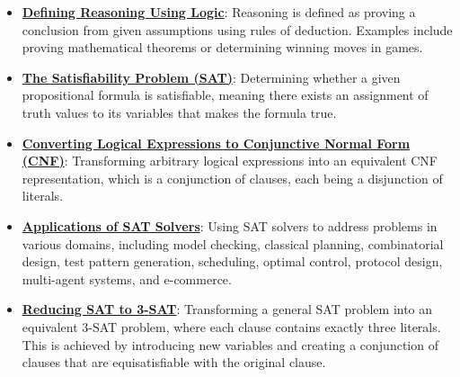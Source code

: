 \documentclass{article}%
\begin{document}
\begin{itemize}[leftmargin=*]%
\item \href{https://purdue.brightspace.com/d2l/common/assets/pdfjs-d2l-dist/1.0.14-legacy/web/viewer.html?file=\%2Fcontent\%2Fenforced\%2F1095467-wl.202510.CS.24300.001\%2F13L1-Logic.pdf\%3Fou\%3D1095467\&lang=en-us\&container=d2l-fileviewer-rendered-pdf\&fullscreen=d2l-fileviewer-rendered-pdf-dialog\&height=667#page=7}{\textbf{Defining Reasoning Using Logic}}: Reasoning is defined as proving a conclusion from given assumptions using rules of deduction. Examples include proving mathematical theorems or determining winning moves in games.%
\item \href{https://purdue.brightspace.com/d2l/common/assets/pdfjs-d2l-dist/1.0.14-legacy/web/viewer.html?file=\%2Fcontent\%2Fenforced\%2F1095467-wl.202510.CS.24300.001\%2F13L1-Logic.pdf\%3Fou\%3D1095467\&lang=en-us\&container=d2l-fileviewer-rendered-pdf\&fullscreen=d2l-fileviewer-rendered-pdf-dialog\&height=667#page=15}{\textbf{The Satisfiability Problem (SAT)}}: Determining whether a given propositional formula is satisfiable, meaning there exists an assignment of truth values to its variables that makes the formula true.%
\item \href{https://purdue.brightspace.com/d2l/common/assets/pdfjs-d2l-dist/1.0.14-legacy/web/viewer.html?file=\%2Fcontent\%2Fenforced\%2F1095467-wl.202510.CS.24300.001\%2F13L1-Logic.pdf\%3Fou\%3D1095467\&lang=en-us\&container=d2l-fileviewer-rendered-pdf\&fullscreen=d2l-fileviewer-rendered-pdf-dialog\&height=667#page=16}{\textbf{Converting Logical Expressions to Conjunctive Normal Form (CNF)}}: Transforming arbitrary logical expressions into an equivalent CNF representation, which is a conjunction of clauses, each being a disjunction of literals.%
\item \href{https://purdue.brightspace.com/d2l/common/assets/pdfjs-d2l-dist/1.0.14-legacy/web/viewer.html?file=\%2Fcontent\%2Fenforced\%2F1095467-wl.202510.CS.24300.001\%2F13L1-Logic.pdf\%3Fou\%3D1095467\&lang=en-us\&container=d2l-fileviewer-rendered-pdf\&fullscreen=d2l-fileviewer-rendered-pdf-dialog\&height=667#page=20}{\textbf{Applications of SAT Solvers}}: Using SAT solvers to address problems in various domains, including model checking, classical planning, combinatorial design, test pattern generation, scheduling, optimal control, protocol design, multi-agent systems, and e-commerce.%
\item \href{https://purdue.brightspace.com/d2l/common/assets/pdfjs-d2l-dist/1.0.14-legacy/web/viewer.html?file=\%2Fcontent\%2Fenforced\%2F1095467-wl.202510.CS.24300.001\%2F13L1-Logic.pdf\%3Fou\%3D1095467\&lang=en-us\&container=d2l-fileviewer-rendered-pdf\&fullscreen=d2l-fileviewer-rendered-pdf-dialog\&height=667#page=24}{\textbf{Reducing SAT to 3{-}SAT}}: Transforming a general SAT problem into an equivalent 3-SAT problem, where each clause contains exactly three literals. This is achieved by introducing new variables and creating a conjunction of clauses that are equisatisfiable with the original clause.%
\end{itemize}%
\end{document}
